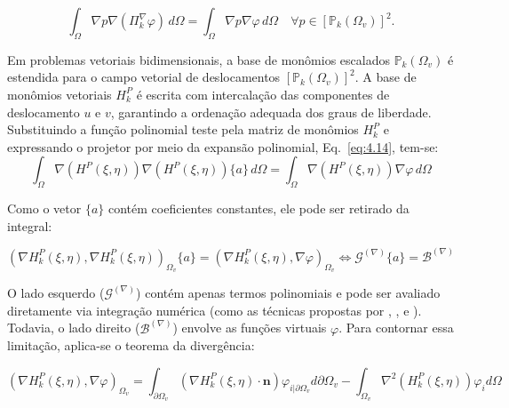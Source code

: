     \begin{equation}
        \int_\Omega \nabla p \nabla (\Pi_k^\nabla \varphi)  \, d\Omega = \int_\Omega \nabla p \nabla \varphi  \, d\Omega \quad \forall p \in [\mathbb{P}_k(\Omega_v)]^2.
        \label{eq:4.21}
    \end{equation}

    \indent Em problemas vetoriais bidimensionais, a base de monômios escalados $\mathbb{P}_k(\Omega_v)$ é estendida para o campo vetorial de deslocamentos $[\mathbb{P}_k(\Omega_v)]^2$. A base de monômios vetoriais $H_k^{P}$ é escrita com intercalação das componentes de deslocamento $u$ e $v$, garantindo a ordenação adequada dos graus de liberdade. Substituindo a função polinomial teste pela matriz de monômios $H_k^P$ e expressando o projetor por meio da expansão polinomial, Eq.~\ref{eq:4.14}, tem-se: 
    \begin{equation}
        \int_\Omega \nabla (H^P(\xi,\eta)) \nabla (H^P(\xi,\eta)) \{a\}  \, d\Omega = \int_\Omega \nabla (H^P(\xi,\eta)) \nabla \varphi  \, d\Omega
        \label{eq:4.22}
    \end{equation}

    \indent Como o vetor $\{a\}$ contém coeficientes constantes, ele pode ser retirado da integral: 

    \begin{equation}
        \left(\nabla H_k^P(\xi,\eta), \nabla H_k^P(\xi,\eta) \right)_{\Omega_v}  \{a\} =  (\nabla H_k^P(\xi,\eta), \nabla \varphi)_{\Omega_v} \Leftrightarrow \mathcal{G}^{(\nabla)} \{a\} = \mathcal{B}^{(\nabla)}
        \label{eq:4.23}
    \end{equation}

    \indent O lado esquerdo ($\mathcal{G}^{(\nabla)}$) contém apenas termos polinomiais e pode ser avaliado diretamente via integração numérica (como as técnicas propostas por \citet{bivariatesplineconstructionorthonormalpolynomialspolygonaldomainsitsapplicationsquadrature2026}, \citet{productgausscubaturepolygonsbasedgreensintegrationformula2007}, \citet{calculationarbitrarymomentspolygonsa} e \citet{numericalintegrationpolynomialsdiscontinuousfunctionsirregularconvexpolygonspolyhedrons2011}). Todavia, o lado direito ($\mathcal{B}^{(\nabla)}$) envolve as funções virtuais $\varphi$. Para contornar essa limitação, aplica-se o teorema da divergência: 
    
    \begin{equation}
        (\nabla H_k^P(\xi,\eta) , \nabla \varphi)_{\Omega_v} = \int_{\partial \Omega_v} \left(\nabla H_k^P(\xi,\eta) \cdot \mathbf{n} \right) \varphi_{i\vert{}{\partial \Omega_v}} d{\partial \Omega_v} - \int_{\Omega_v} \nabla^2 (H_k^P(\xi,\eta)) \varphi_i d\Omega 
        \label{eq:4.24}
    \end{equation} 

